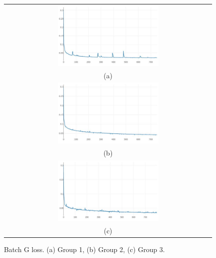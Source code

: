 \documentclass[10pt,twocolumn,letterpaper]{article}
\begin{document}
\begin{figure}%
\centering\begin{tabular}{c}
\includegraphics[width=0.5\textwidth]{fig10-a}\\
(a)\\[3ex]%
\includegraphics[width=0.5\textwidth]{fig10-b}\\
(b)\\[3ex]
\includegraphics[width=0.5\textwidth]{fig10-c}\\
(c)
\end{tabular}
\caption{Batch G loss. (a) Group 1, (b) Group 2, (c) Group 3.}%
\label{fig10}%
\end{figure}
\end{document}
